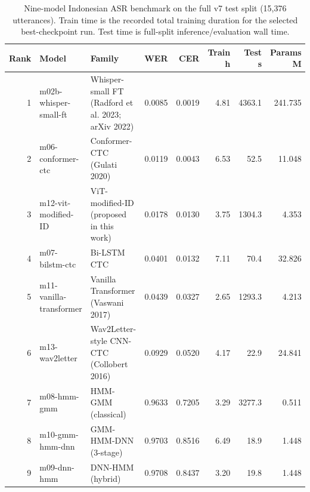 \begin{table}[t]
\centering
\caption{Nine-model Indonesian ASR benchmark on the full v7 test split (15,376 utterances). Train time is the recorded total training duration for the selected best-checkpoint run. Test time is full-split inference/evaluation wall time.}
\label{tab:asr-9model-full}
\small
\begin{tabular}{rllrrrrr}
\toprule
Rank & Model & Family & WER & CER & Train h & Test s & Params M \\
\midrule
1 & m02b-whisper-small-ft & Whisper-small FT (Radford et al. 2023; arXiv 2022) & 0.0085 & 0.0019 & 4.81 & 4363.1 & 241.735 \\
2 & m06-conformer-ctc & Conformer-CTC (Gulati 2020) & 0.0119 & 0.0043 & 6.53 & 52.5 & 11.048 \\
3 & m12-vit-modified-ID & ViT-modified-ID (proposed in this work) & 0.0178 & 0.0130 & 3.75 & 1304.3 & 4.353 \\
4 & m07-bilstm-ctc & Bi-LSTM CTC & 0.0401 & 0.0132 & 7.11 & 70.4 & 32.826 \\
5 & m11-vanilla-transformer & Vanilla Transformer (Vaswani 2017) & 0.0439 & 0.0327 & 2.65 & 1293.3 & 4.213 \\
6 & m13-wav2letter & Wav2Letter-style CNN-CTC (Collobert 2016) & 0.0929 & 0.0520 & 4.17 & 22.9 & 24.841 \\
7 & m08-hmm-gmm & HMM-GMM (classical) & 0.9633 & 0.7205 & 3.29 & 3277.3 & 0.511 \\
8 & m10-gmm-hmm-dnn & GMM-HMM-DNN (3-stage) & 0.9703 & 0.8516 & 6.49 & 18.9 & 1.448 \\
9 & m09-dnn-hmm & DNN-HMM (hybrid) & 0.9708 & 0.8437 & 3.20 & 19.8 & 1.448 \\
\bottomrule
\end{tabular}
\end{table}
